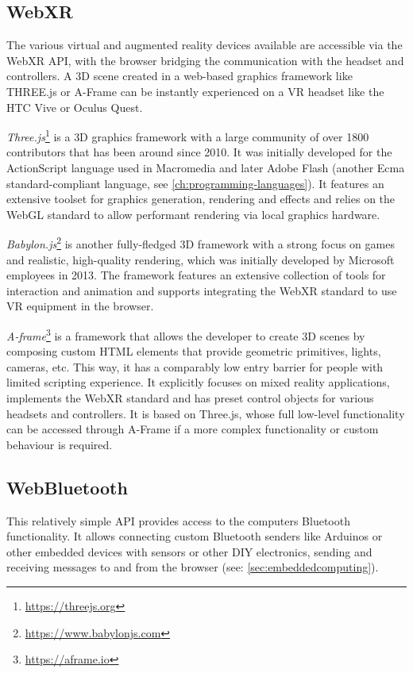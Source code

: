 \subsection{WebXR}

The various virtual and augmented reality devices available are accessible via the \ac{WebXR} \ac{API}, with the browser bridging the communication with the headset and controllers. A \ac{3D} scene created in a web-based graphics framework like THREE.js or A-Frame can be instantly experienced on a \ac{VR} headset like the HTC Vive or Oculus Quest.



\emph{Three.js}\footnote{\url{https://threejs.org}} is a \ac{3D} graphics framework with a large community of over 1800 contributors that has been around since 2010.
It was initially developed for the ActionScript language used in Macromedia and later Adobe Flash (another Ecma standard-compliant language, see \autoref{ch:programming-languages}).
It features an extensive toolset for graphics generation, rendering and effects and relies on the WebGL standard to allow performant rendering via local graphics hardware.

\emph{Babylon.js}\footnote{\url{https://www.babylonjs.com}} is another fully-fledged \ac{3D} framework with a strong focus on games and realistic, high-quality rendering, which was initially developed by Microsoft employees in 2013.
The framework features an extensive collection of tools for interaction and animation and supports integrating the \ac{WebXR} standard to use \ac{VR} equipment in the browser.

\emph{A-frame}\footnote{\url{https://aframe.io}} is a framework that allows the developer to create \ac{3D} scenes by composing custom \ac{HTML} elements that provide geometric primitives, lights, cameras, etc.
This way, it has a comparably low entry barrier for people with limited scripting experience.
It explicitly focuses on mixed reality applications, implements the WebXR standard and has preset control objects for various headsets and controllers.
It is based on Three.js, whose full low-level functionality can be accessed through A-Frame if a more complex functionality or custom behaviour is required.

\subsection{WebBluetooth}

This relatively simple \ac{API} provides access to the computer\textquotesingle s Bluetooth functionality.
It allows connecting custom Bluetooth senders like Arduinos or other embedded devices with sensors or other \ac{DIY} electronics, sending and receiving messages to and from the browser (see: \autoref{sec:embeddedcomputing}).

